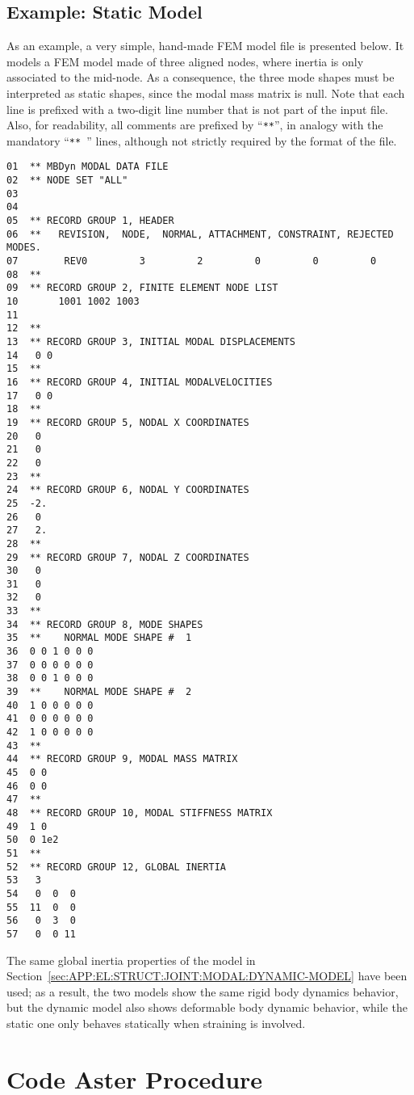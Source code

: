 \subsection{Example: Static Model}
As an example, a very simple, hand-made FEM model file is presented below.
It models a FEM model made of three aligned nodes, where inertia 
is only associated to the mid-node.
As a consequence, the three mode shapes must be interpreted as static
shapes, since the modal mass matrix is null.
Note that each line is prefixed with a two-digit line number 
that is not part of the input file.
Also, for readability, all comments are prefixed by ``\texttt{**}'', in analogy
with the mandatory ``\texttt{** }'' lines, although not strictly 
required by the format of the file.

\noindent
{\small
\begin{verbatim}
01  ** MBDyn MODAL DATA FILE
02  ** NODE SET "ALL" 
03    
04    
05  ** RECORD GROUP 1, HEADER
06  **   REVISION,  NODE,  NORMAL, ATTACHMENT, CONSTRAINT, REJECTED MODES.
07        REV0         3         2         0         0         0
08  **
09  ** RECORD GROUP 2, FINITE ELEMENT NODE LIST
10       1001 1002 1003
11  
12  **
13  ** RECORD GROUP 3, INITIAL MODAL DISPLACEMENTS
14   0 0
15  **
16  ** RECORD GROUP 4, INITIAL MODALVELOCITIES
17   0 0
18  **
19  ** RECORD GROUP 5, NODAL X COORDINATES
20   0
21   0
22   0
23  **
24  ** RECORD GROUP 6, NODAL Y COORDINATES
25  -2.
26   0
27   2.
28  **
29  ** RECORD GROUP 7, NODAL Z COORDINATES
30   0
31   0
32   0
33  **
34  ** RECORD GROUP 8, MODE SHAPES
35  **    NORMAL MODE SHAPE #  1
36  0 0 1 0 0 0
37  0 0 0 0 0 0
38  0 0 1 0 0 0
39  **    NORMAL MODE SHAPE #  2
40  1 0 0 0 0 0
41  0 0 0 0 0 0
42  1 0 0 0 0 0
43  **
44  ** RECORD GROUP 9, MODAL MASS MATRIX
45  0 0
46  0 0
47  **
48  ** RECORD GROUP 10, MODAL STIFFNESS MATRIX
49  1 0
50  0 1e2
51  **
52  ** RECORD GROUP 12, GLOBAL INERTIA
53   3
54   0  0  0
55  11  0  0
56   0  3  0
57   0  0 11
\end{verbatim}
}

The same global inertia properties of the model 
in Section~\ref{sec:APP:EL:STRUCT:JOINT:MODAL:DYNAMIC-MODEL} have been used;
as a result, the two models show the same rigid body dynamics behavior,
but the dynamic model also shows deformable body dynamic behavior, while
the static one only behaves statically when straining is involved.





\section{Code Aster Procedure}
\label{sec:APP:EL:STRUCT:JOINT:MODAL:ASTER}


